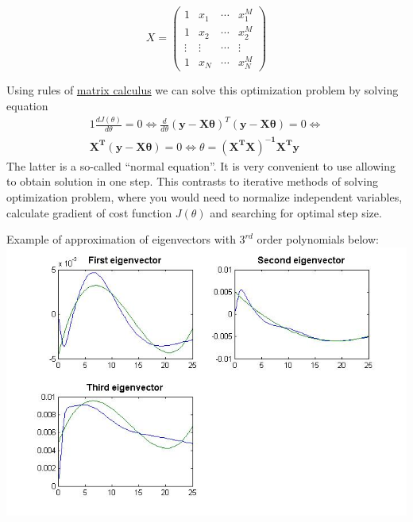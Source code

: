 \documentclass[11pt]{article} %
\begin{document}
\begin{equation}
X = 
\begin{pmatrix}
1 & x_1 & \cdots & x_1^M \\
1 & x_2 & \cdots & x_2^M \\
\vdots & \vdots & \cdots & \vdots \\
1 & x_N & \cdots & x_N^M 
\end{pmatrix}
\nonumber
\end{equation} 

Using rules of \href{http://en.wikipedia.org/wiki/Matrix\_calculus}{matrix calculus} we can solve this optimization problem by solving equation 
\begin{alignat}{1}
\frac{dJ(\theta)}{d\theta} = 0 \iff 
\frac{d}{d\theta} \left(\mathbf{y}-\mathbf{X\theta}\right)^T\left(\mathbf{y}-\mathbf{X\theta}\right) = 0
\iff \nonumber \\
\mathbf{X^T}(\mathbf{y-X\theta}) = 0 \iff \theta = \mathbf{\left(X^T X\right)^{-1}X^T y}
\end{alignat}
The latter is a so-called ``normal equation''. It is very convenient to use allowing to obtain solution in one step. This contrasts to iterative methods of solving optimization problem, where you would need to normalize independent variables, calculate gradient of cost function $J(\theta)$ and searching for optimal step size. 

Example of approximation of eigenvectors with $3^{rd}$ order polynomials below:\\
\includegraphics[scale=0.6]{fitting.jpg}\\
\end{document}
